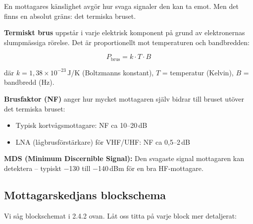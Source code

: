 \documentclass[a4paper,11pt,twoside]{book}
\newcommand{\emoji}[1]{{\emojifont #1}}
\begin{document}
En mottagares känslighet avgör hur svaga signaler den kan ta emot.
Men det finns en absolut gräns: det termiska bruset.

\begin{bluebox}[title={\emoji{🔑} Mottagarkänslighet och brus}]
\textbf{Termiskt brus} uppstår i varje elektrisk komponent på
grund av elektronernas slumpmässiga rörelse. Det är proportionellt
mot temperaturen och bandbredden:

\[ P_{\text{brus}} = k \cdot T \cdot B \]

där $k = 1{,}38 \times 10^{-23}$\,J/K (Boltzmanns konstant),
$T$ = temperatur (Kelvin), $B$ = bandbredd (Hz).

\medskip
\textbf{Brusfaktor (NF)} anger hur mycket mottagaren själv
bidrar till bruset utöver det termiska bruset:
\begin{itemize}
  \item Typisk kortvågsmottagare: NF ca 10--20\,dB
  \item LNA (lågbrusförstärkare) för VHF/UHF: NF ca 0,5--2\,dB
\end{itemize}

\medskip
\textbf{MDS (Minimum Discernible Signal):} Den svagaste signal
mottagaren kan detektera -- typiskt $-$130 till $-$140\,dBm
för en bra HF-mottagare.
\end{bluebox}

\subsection{Mottagarskedjans blockschema}

Vi såg blockschemat i 2.4.2 ovan. Låt oss titta på varje block
mer detaljerat:
\end{document}
